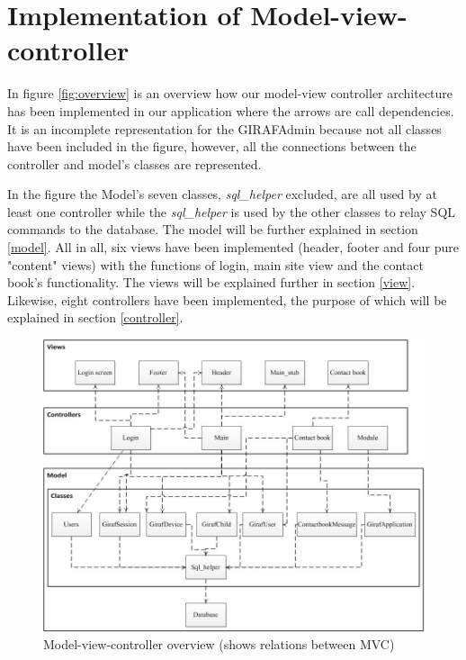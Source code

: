 \section{Implementation of Model-view-controller}
In figure \vref{fig:overview} is an overview how our model-view controller architecture has been implemented in our application where the arrows are call dependencies. It is an incomplete representation for the GIRAFAdmin because not all classes have been included in the figure, however, all the connections between the controller and model's classes are represented. 

In the figure the Model's seven classes, \emph{sql\_helper} excluded, are all used by at least one controller while the \emph{sql\_helper} is used by the other classes to relay SQL commands to the database. The model will be further explained in section \vref{model}. All in all, six views have been implemented (header, footer and four pure "content" views) with the functions of login, main site view and the contact book's functionality. The views will be explained further in section \vref{view}. Likewise, eight controllers have been implemented, the purpose of which will be explained in section \vref{controller}.

\begin{figure}
	\centering
		\includegraphics[width=1.00\textwidth]{img/overview.jpg}
	\caption{Model-view-controller overview (shows relations between MVC)}
	\label{fig:overview}
\end{figure}
